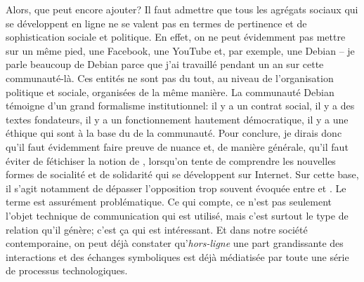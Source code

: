 {Alors, que peut encore ajouter? Il faut admettre que tous les agr\'egats sociaux qui se d\'eveloppent en ligne ne se valent pas en termes de pertinence et de sophistication sociale et politique. En effet, on ne peut \'evidemment pas mettre sur un m\^eme pied, une  Facebook, une  YouTube et, par exemple, une  Debian {--} je parle beaucoup de Debian parce que j'ai travaill\'e pendant un an sur cette communaut\'e{}-l\`a. Ces entit\'es ne sont pas du tout, au niveau de l'organisation politique et sociale, organis\'ees de la m\^eme mani\`ere. La communaut\'e Debian t\'emoigne d'un grand formalisme institutionnel: il y a un contrat social, il y a des textes fondateurs, il y a un fonctionnement hautement d\'emocratique, il y a une \'ethique qui sont \`a la base du  de la communaut\'e. Pour conclure, je dirais donc qu'il faut \'evidemment faire preuve de nuance et, de mani\`ere g\'en\'erale, qu'il faut \'eviter de f\'etichiser la notion de , lorsqu'on tente de comprendre les nouvelles formes de socialit\'e et de solidarit\'e qui se d\'eveloppent sur Internet.{\em } Sur cette base, il s'agit notamment de d\'epasser l'opposition trop souvent \'evoqu\'ee entre  et . Le terme  est assur\'ement probl\'ematique. Ce qui compte, ce n'est pas seulement l'objet technique de communication qui est utilis\'e, mais c'est surtout le type de relation qu'il g\'en\`ere; c'est \c{c}a qui est int\'eressant. Et dans notre soci\'et\'e contemporaine, on peut d\'ej\`a constater qu'{\em hors{}-ligne} une part grandissante des interactions et des \'echanges symboliques est d\'ej\`a m\'ediatis\'ee par toute une s\'erie de processus technologiques.}